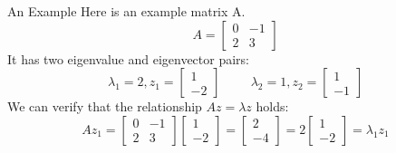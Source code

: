 \documentclass[aspectratio=169]{../latex_main/tntbeamer}  %
\begin{document}
	
	\begin{frame}{An Example}
	    Here is an example matrix A.
	    \begin{equation*}
	        A = \left[\begin{array}{cc}
	           0  &  -1\\
	           2  &   3
	        \end{array}\right]
	         \end{equation*}
	        It has two eigenvalue and eigenvector pairs:
	        \begin{equation*}
	            \lambda_1 = 2, z_1 = \left[\begin{array}{c}
	           1\\
	           -2
	        \end{array}\right]
	        \hspace{1cm} \lambda_2 = 1, z_2 = \left[\begin{array}{c}
	           1\\
	           -1
	        \end{array}\right]
	        \end{equation*}
	        We can verify that the relationship		$Az = \lambda z$	   holds:
	        \begin{equation*}
	            Az_1 = \left[\begin{array}{cc}
	           0  &  -1\\
	           2  &   3
	        \end{array}\right] \left[\begin{array}{c}
	           1\\
	           -2
	        \end{array}\right] = \left[\begin{array}{c}
	           2\\
	           -4
	        \end{array}\right] = 2 \left[\begin{array}{c}
	           1\\
	           -2
	        \end{array}\right] = \lambda_1 z_1
	        \end{equation*}
	\end{frame}
	
\end{document}
